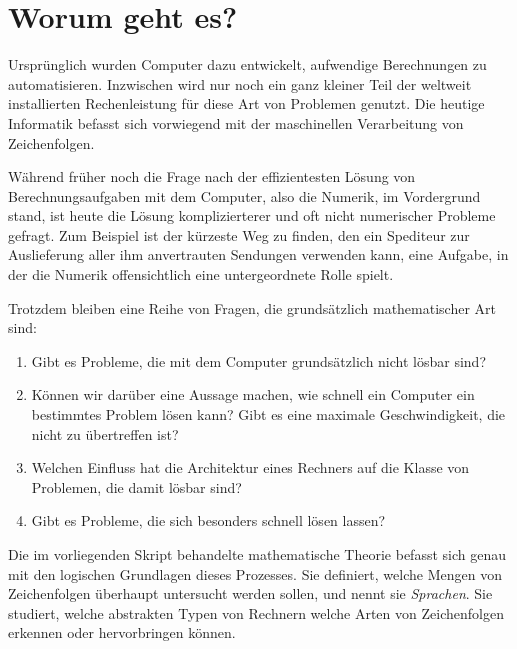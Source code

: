 %
%
%
\rhead{}
\chapter*{Worum geht es?\label{chapter-intro}}
Ursprünglich wurden Computer dazu entwickelt, aufwendige
Berechnungen zu automatisieren.
Inzwischen wird nur noch ein
ganz kleiner Teil der weltweit installierten Rechenleistung für
diese Art von Problemen genutzt.
Die heutige Informatik befasst sich vorwiegend mit der maschinellen
Verarbeitung von Zeichenfolgen.

Während früher noch die Frage nach der effizientesten Lösung von
Berechnungsaufgaben mit dem Computer, also die Numerik, im Vordergrund stand,  
ist heute die Lösung komplizierterer und oft nicht numerischer Probleme 
gefragt.
Zum Beispiel ist der kürzeste Weg zu finden, den ein Spediteur
zur Auslieferung aller ihm anvertrauten Sendungen verwenden kann, eine
Aufgabe, in der die Numerik offensichtlich eine untergeordnete Rolle spielt.

Trotzdem bleiben eine Reihe von Fragen, die grundsätzlich mathematischer
Art sind:
\begin{enumerate}
\item Gibt es Probleme, die mit dem Computer grundsätzlich nicht
lösbar sind?
\item Können wir darüber eine Aussage machen, wie schnell ein Computer
ein bestimmtes Problem lösen kann? Gibt es eine maximale Geschwindigkeit,
die nicht zu übertreffen ist?
\item Welchen Einfluss hat die Architektur eines Rechners auf die Klasse
von Problemen, die damit lösbar sind?
\item Gibt es Probleme, die sich besonders schnell lösen lassen?
\end{enumerate}
Die im vorliegenden Skript behandelte mathematische Theorie befasst sich
genau mit den logischen Grundlagen dieses Prozesses.
Sie definiert, welche Mengen von Zeichenfolgen überhaupt untersucht
werden sollen, und nennt sie {\em Sprachen}.
Sie studiert, welche abstrakten Typen von
Rechnern welche Arten von Zeichenfolgen erkennen oder hervorbringen
können.

